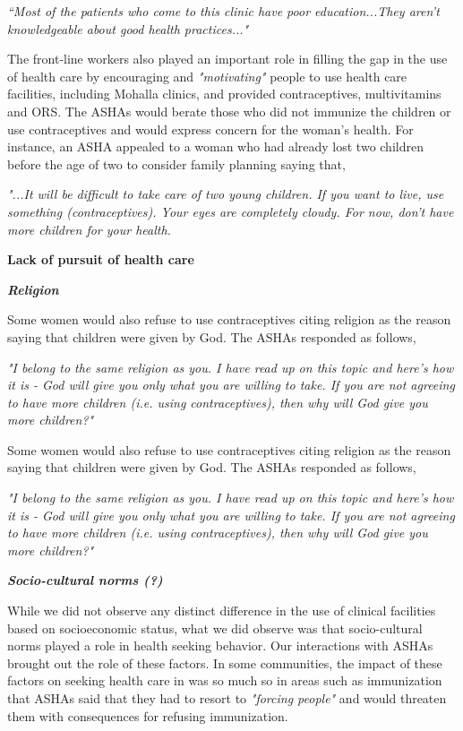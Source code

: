 \textit{“Most of the patients who come to this clinic have poor education...They aren’t knowledgeable about good health practices..."}

The front-line workers also played an important role in filling the gap in the use of health care by encouraging and \textit{"motivating"} people to use health care facilities, including Mohalla clinics, and provided contraceptives, multivitamins and ORS. The ASHAs would berate those who did not immunize the children or use contraceptives and would express concern for the woman's health. For instance, an ASHA appealed to a woman who had already lost two children before the age of two to consider family planning saying that, 

\textit{"...It will be difficult to take care of two young children. If you want to live, use something (contraceptives). Your eyes are completely cloudy. For now, don’t have more children for your health.}

\textbf{
Lack of pursuit of health care}

\textit{\textbf{Religion}}

Some women would also refuse to use contraceptives citing religion as the reason saying that children were given by God. The ASHAs responded as follows,

\textit{"I belong to the same religion as you. I have read up on this topic and here's how it is - God will give you only what you are willing to take. If you are not agreeing to have more children (i.e. using contraceptives), then why will God give you more children?"}

Some women would also refuse to use contraceptives citing religion as the reason saying that children were given by God. The ASHAs responded as follows,

\textit{"I belong to the same religion as you. I have read up on this topic and here's how it is - God will give you only what you are willing to take. If you are not agreeing to have more children (i.e. using contraceptives), then why will God give you more children?"}

\textit{\textbf{Socio-cultural norms (?)}}

While we did not observe any distinct difference in the use of clinical facilities based on socioeconomic status, what we did observe was that socio-cultural norms played a role in health seeking behavior. Our interactions with ASHAs brought out the role of these factors. In some communities, the impact of these factors on seeking health care in was so much so in areas such as immunization that ASHAs said that they had to resort to \textit{"forcing people"} and would threaten them with consequences for refusing immunization.


